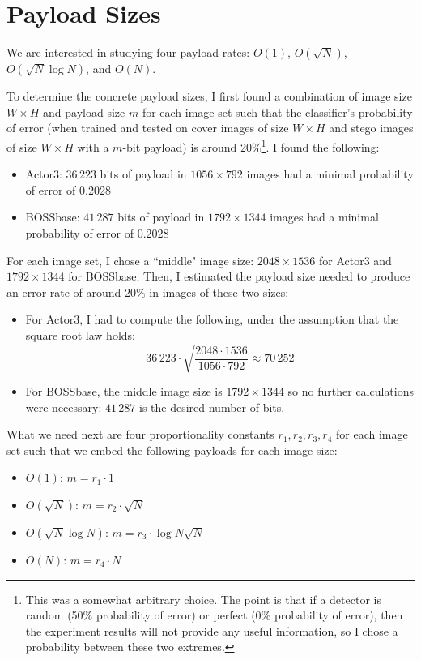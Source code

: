 \documentclass[11pt,a4paper,twoside,openright]{report}
\begin{document}
\section{Payload Sizes} \label{sec:payload-sizes}

We are interested in studying four payload rates: $O(1)$, $O(\sqrt{N})$, $O(\sqrt{N} \log{N})$, and $O(N)$.

To determine the concrete payload sizes, I first found a combination of image size $W \times H$ and payload size $m$ for each image set such that the classifier's probability of error (when trained and tested on cover images of size $W \times H$ and stego images of size $W \times H$ with a $m$-bit payload) is around 20\%\footnote{This was a somewhat arbitrary choice. The point is that if a detector is random (50\% probability of error) or perfect (0\% probability of error), then the experiment results will not provide any useful information, so I chose a probability between these two extremes.}. I found the following:
\begin{itemize}
    \item Actor3: $36\,223$ bits of payload in $1056\times792$ images had a minimal probability of error of 0.2028
    \item BOSSbase: $41\,287$ bits of payload in $1792\times1344$ images had a minimal probability of error of 0.2028
\end{itemize}

For each image set, I chose a ``middle" image size: $2048\times1536$ for Actor3 and $1792\times1344$ for BOSSbase. Then, I estimated the payload size needed to produce an error rate of around 20\% in images of these two sizes:
\begin{itemize}
	\item For Actor3, I had to compute the following, under the assumption that the square root law holds:
		\begin{equation*}
			36\,223 \cdot \sqrt{\frac{2048\cdot1536}{1056\cdot792}} \approx 70\,252
		\end{equation*}
	\item For BOSSbase, the middle image size is $1792\times1344$ so no further calculations were necessary: $41\,287$ is the desired number of bits.
\end{itemize}

What we need next are four proportionality constants $r_1, r_2, r_3, r_4$ for each image set such that we embed the following payloads for each image size:
\begin{itemize}
    \item $O(1)$: $m = r_1 \cdot 1$
    \item $O(\sqrt{N})$: $m = r_2 \cdot \sqrt{N}$
    \item $O(\sqrt{N} \log{N})$: $m = r_3 \cdot \log{N} \sqrt{N}$
    \item $O(N)$: $m = r_4 \cdot N$
\end{itemize}
\end{document}
